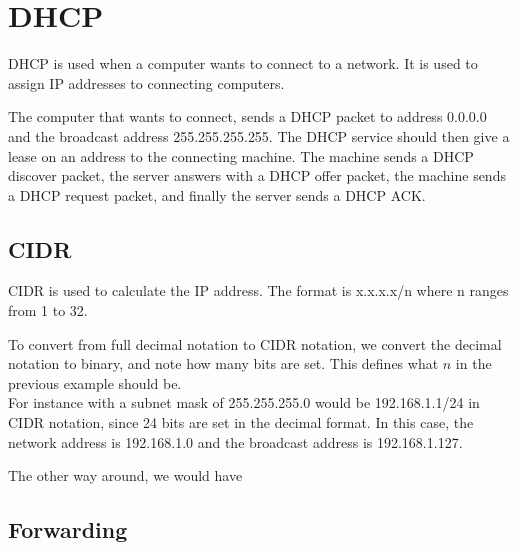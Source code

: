 \section{DHCP}
DHCP is used when a computer wants to connect to a network. It is used
to assign IP addresses to connecting computers.

The computer that wants to connect, sends a DHCP packet to address
0.0.0.0 and the broadcast address 255.255.255.255. The DHCP service
should then give a lease on an address to the connecting
machine. The machine sends a DHCP discover packet, the server answers
with a DHCP offer packet, the machine sends a DHCP request packet, and
finally the server sends a DHCP ACK.

\subsection{CIDR}
CIDR is used to calculate the IP address. The format is x.x.x.x/n
where n ranges from 1 to 32.

To convert from full decimal notation to CIDR notation, we convert the
decimal notation to binary, and note how many bits are set. This
defines what $n$ in the previous example should be.\\
For instance with a subnet mask of 255.255.255.0 would be
192.168.1.1/24 in CIDR notation, since 24 bits are set in the
decimal format. In this case, the network address is 192.168.1.0 and the
broadcast address is 192.168.1.127.

The other way around, we would have 

\subsection{Forwarding}
